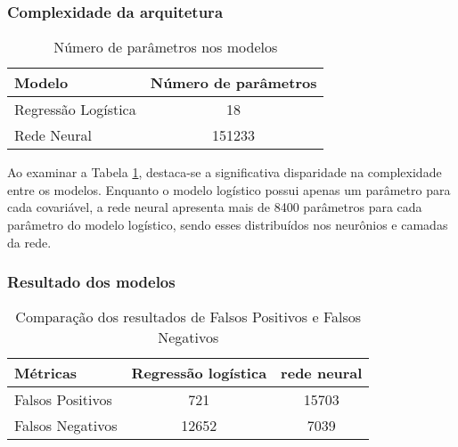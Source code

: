 \subsubsection{Complexidade da arquitetura}

\begin{table}[H]
  \centering
  \begin{tabular}{lc}
  \hline
  \textbf{Modelo} & \textbf{Número de parâmetros} \\ \hline
  Regressão Logística & 18 \\ 
  Rede Neural & 151233 \\ \hline
  \end{tabular}
  \caption{Número de parâmetros nos modelos}
  \label{table:model_parameters}
\end{table}

Ao examinar a Tabela \ref{table:model_parameters}, destaca-se a significativa disparidade na
complexidade entre os modelos. Enquanto o modelo logístico possui apenas um parâmetro para cada covariável,
a rede neural apresenta mais de 8400 parâmetros para cada parâmetro do modelo logístico,  
sendo esses distribuídos nos neurônios e camadas da rede.

\subsubsection{Resultado dos modelos}

\begin{table}[H]
  \centering
  \begin{tabular}{lcc}
    \hline
    \textbf{Métricas} & \textbf{Regressão logística} & \textbf{rede neural} \\
    \hline
    Falsos Positivos   & 721                     & 15703 \\
    Falsos Negativos   & 12652                   & 7039 \\
    \hline
  \end{tabular}
  \caption{Comparação dos resultados de Falsos Positivos e Falsos Negativos}
  \label{tab:false_positives_negatives}
\end{table}


